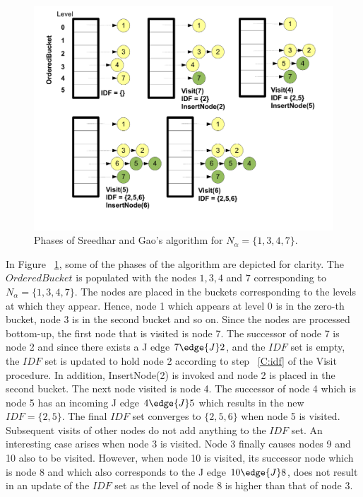    \begin{figure}[htb]
    \centerline{\includegraphics[scale=0.3]{sreedhargao.pdf}}
    \caption{Phases of Sreedhar and Gao's algorithm for $N_\alpha=\{1,3,4,7\}$.}
    \label{fig:sreedhargao}
    \end{figure} 

In Figure ~\ref{fig:sreedhargao}, some of the phases of the algorithm are depicted for clarity. The $OrderedBucket$
is populated with the nodes $1,3,4$ and $7$ corresponding to $N_\alpha=\{1,3,4,7\}$. The nodes are
placed in the buckets corresponding to the levels at which they appear. Hence, node 1 which appears at 
level 0 is in the zero-th bucket, node 3 is in the second bucket and so on. Since the
nodes are processed bottom-up, the first node that is visited is node 7. The successor of node 7 is node
2 and since there exists a J edge $7 \edge{J} 2$, and the $IDF$ set is empty, the $IDF$ set is updated
to hold node 2 according to step ~\ref{C:idf} of the Visit procedure. In addition, InsertNode(2) is invoked and 
node 2 is placed in the second bucket. The next node visited is node 4. The successor of node 4 which is node
5 has an incoming J edge $4 \edge{J} 5$ which results in the new $IDF = \{2,5\}$. The final $IDF$ set converges
to $\{2,5,6\}$ when node 5 is visited. Subsequent visits of other nodes do not add anything to the
$IDF$ set. An interesting case arises when node 3 is visited. Node 3 finally causes nodes 9 and 10 also 
to be visited. However, when node 10 is visited, its successor node which is node 8 and which also 
corresponds to the J edge $10 \edge{J} 8$, does not result in an update of the $IDF$ set as the level of
node 8 is higher than that of node 3.

